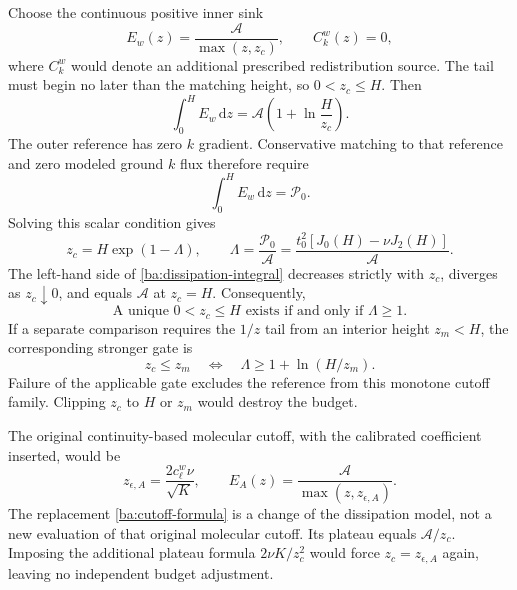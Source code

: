 \documentclass[11pt,a4paper]{article}
\numberwithin{equation}{section}
\begin{document}
Choose the continuous positive inner sink
\begin{equation}
 \boxed{E_w(z)=\frac{\mathcal A}{\max(z,z_c)},\qquad C_k^w(z)=0,}
 \label{ba:dissipation}
\end{equation}
where $C_k^w$ would denote an additional prescribed redistribution source.
The tail must begin no later than the matching height, so $0<z_c\leq H$.
Then
\begin{equation}
 \int_0^HE_w\,\mathrm dz
 =\mathcal A\left(1+\ln\frac H{z_c}\right).
 \label{ba:dissipation-integral}
\end{equation}
The outer reference has zero $k$ gradient. Conservative matching to that
reference and zero modeled ground $k$ flux therefore require
\begin{equation}
 \int_0^HE_w\,\mathrm dz=\mathcal P_0.
 \label{ba:budget-condition}
\end{equation}
Solving this scalar condition gives
\begin{equation}
 \boxed{z_c=H\exp(1-\Lambda),\qquad
 \Lambda=\frac{\mathcal P_0}{\mathcal A}
 =\frac{t_0^2[J_0(H)-\nu J_2(H)]}{\mathcal A}.}
 \label{ba:cutoff-formula}
\end{equation}
The left-hand side of \eqref{ba:dissipation-integral} decreases strictly
with $z_c$, diverges as $z_c\downarrow0$, and equals $\mathcal A$ at
$z_c=H$. Consequently,
\begin{equation}
 \boxed{\text{A unique }0<z_c\leq H\text{ exists if and only if }\Lambda\geq1.}
 \label{ba:cutoff-gate}
\end{equation}
If a separate comparison requires the $1/z$ tail from an interior height
$z_m<H$, the corresponding stronger gate is
\begin{equation}
 z_c\leq z_m\quad\Longleftrightarrow\quad
 \Lambda\geq1+\ln(H/z_m).
 \label{ba:interior-gate}
\end{equation}
Failure of the applicable gate excludes the reference from this monotone
cutoff family. Clipping $z_c$ to $H$ or $z_m$ would destroy the budget.

The original continuity-based molecular cutoff, with the calibrated
coefficient inserted, would be
\begin{equation}
 z_{\epsilon,A}=\frac{2c_\ell^w\nu}{\sqrt K},\qquad
 E_A(z)=\frac{\mathcal A}{\max(z,z_{\epsilon,A})}.
 \label{ba:original-cutoff}
\end{equation}
The replacement \eqref{ba:cutoff-formula} is a change of the dissipation
model, not a new evaluation of that original molecular cutoff. Its
plateau equals $\mathcal A/z_c$. Imposing the additional plateau formula
$2\nu K/z_c^2$ would force $z_c=z_{\epsilon,A}$ again, leaving no
independent budget adjustment.
\end{document}
